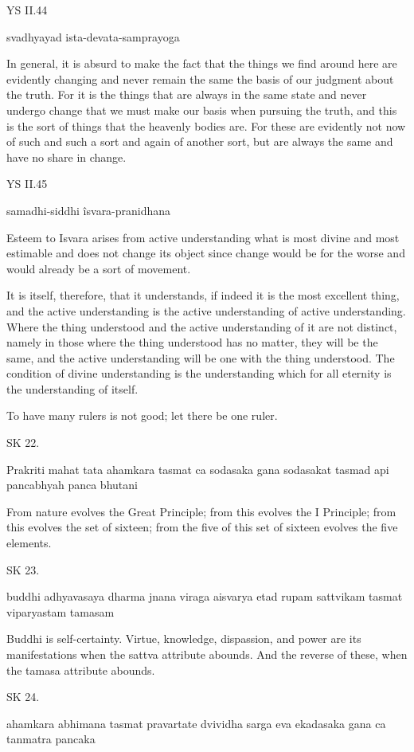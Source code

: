YS II.44

    svadhyayad ista-devata-samprayoga

In general, it is absurd to make the fact that the things
we find around here are evidently changing and never remain the same
the basis of our judgment about the truth. For it is the things that
are always in the same state and never undergo change that we must make
our basis when pursuing the truth, and this is the sort of things that
the heavenly bodies are. For these are evidently not now of such and such
a sort and again of another sort, but are always the same and have no share in
change.

YS II.45

    samadhi-siddhi îsvara-pranidhana

Esteem to Isvara arises from active understanding what is most divine
and most estimable and does not change its object since change would be for the worse
and would already be a sort of movement.

It is itself, therefore, that it understands, if indeed it is the most excellent thing,
and the active understanding is the active understanding of active understanding.
Where the thing understood and the active understanding of it are not distinct,
namely in those where the thing understood has no matter, they will be the same,
and the active understanding will be one with the thing understood.
The condition of divine understanding is the understanding
which for all eternity is the understanding of itself.

To have many rulers is not good; let there be one ruler.

SK 22.

Prakriti mahat tata ahamkara tasmat ca sodasaka gana
sodasakat tasmad api pancabhyah panca bhutani

From nature evolves the Great Principle;
from this evolves the I Principle;
from this evolves the set of sixteen;
from the five of this set of sixteen evolves the five elements.

SK 23.

buddhi adhyavasaya dharma jnana viraga aisvarya
etad rupam sattvikam tasmat viparyastam tamasam

Buddhi is self-certainty.
Virtue, knowledge, dispassion, and power are its manifestations
when the sattva attribute abounds.
And the reverse of these, when the tamasa attribute abounds.

SK 24.

ahamkara abhimana tasmat pravartate dvividha sarga eva
ekadasaka gana ca tanmatra pancaka


